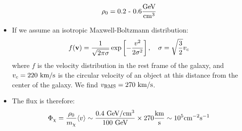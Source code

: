\begin{itemize}
  \begin{equation}
    \rho_0 = 0.2\text{ - }0.6 \frac{\text{GeV}}{\text{cm}^3}
  \end{equation}
  \item If we assume an isotropic Maxwell-Boltzmann distribution:
  \begin{equation}
    f(\mathbf{v}) = \frac{1}{\sqrt{2\pi\sigma}} \exp \left[-\frac{v^2}{2\sigma^2}\right], \quad \sigma = \sqrt\frac{3}{2} v_c
  \end{equation}
  where $f$ is the velocity distribution in the rest frame of the galaxy, and $v_c = 220~\text{km}/\text{s}$ is the circular velocity of an object at this distance from the center of the galaxy. We find $v_\text{RMS} = 270~\text{km}/\text{s}$.
  \item The flux is therefore:
  \begin{equation}
    \Phi_\chi = \frac{\rho_0}{m_\chi} \langle v \rangle \sim \frac{0.4~\text{GeV}/\text{cm}^3}{100~\text{GeV}} \times 270 \frac{\text{km}}{\text{s}} \sim 10^5 \text{cm}^{-2}\text{s}^{-1}
  \end{equation}
\end{itemize}

